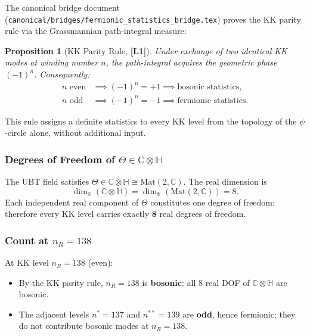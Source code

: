 \documentclass[12pt]{article}
\newtheorem{proposition}[theorem]{Proposition}
\theoremstyle{definition}
\theoremstyle{remark}
\begin{document}
The canonical bridge document
(\texttt{canonical/bridges/fermionic\_statistics\_bridge.tex})
proves the KK parity rule via the Grassmannian path-integral measure:

\begin{proposition}[KK Parity Rule, {\normalfont\textbf{[L1]}}]
Under exchange of two identical KK modes at winding number $n$, the
path-integral acquires the geometric phase $(-1)^n$.  Consequently:
\begin{align}
  n \text{ even} &\implies (-1)^n = +1 \implies \text{bosonic statistics},\\
  n \text{ odd}  &\implies (-1)^n = -1 \implies \text{fermionic statistics}.
\end{align}
\end{proposition}

This rule assigns a definite statistics to every KK level from the
topology of the $\psi$-circle alone, without additional input.

\subsubsection{Degrees of Freedom of $\Theta \in \mathbb{C}\otimes\mathbb{H}$}

The UBT field satisfies $\Theta \in \mathbb{C}\otimes\mathbb{H} \cong
\mathrm{Mat}(2,\mathbb{C})$.  The real dimension is
\begin{equation}
  \dim_{\mathbb{R}}(\mathbb{C}\otimes\mathbb{H})
  = \dim_{\mathbb{R}}(\mathrm{Mat}(2,\mathbb{C})) = 8.
  \label{eq:dimR_eight}
\end{equation}
Each independent real component of $\Theta$ constitutes one degree
of freedom; therefore every KK level carries exactly $\mathbf{8}$
real degrees of freedom.

\subsubsection{Count at $n_R = 138$}

At KK level $n_R = 138$ (even):

\begin{itemize}
  \item By the KK parity rule, $n_R = 138$ is \textbf{bosonic}: all
        8 real DOF of $\mathbb{C}\otimes\mathbb{H}$ are bosonic.
  \item The adjacent levels $n^* = 137$ and $n^{**} = 139$ are
        \textbf{odd}, hence fermionic; they do not contribute bosonic
        modes at $n_R = 138$.
\end{itemize}
\end{document}
